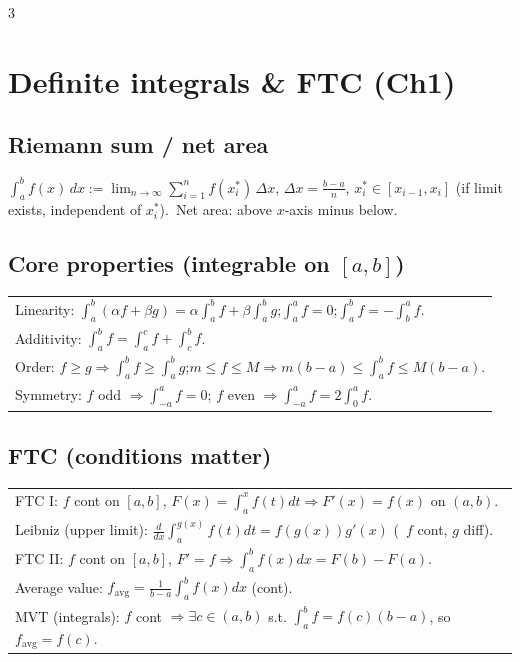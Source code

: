 \documentclass[10pt]{article}
\begin{document}
\begin{multicols}{3}
\footnotesize
\raggedcolumns

\section*{Definite integrals \& FTC (Ch1)}
\subsection*{Riemann sum / net area}
$\displaystyle \int_a^b f(x)\,dx:=\lim_{n\to\infty}\sum_{i=1}^n f(x_i^*)\,\Delta x$, $\Delta x=\frac{b-a}{n}$, $x_i^*\in[x_{i-1},x_i]$ (if limit exists, independent of $x_i^*$).\
Net area: above $x$-axis minus below.

\subsection*{Core properties (integrable on $[a,b]$)}
\vspace{-1pt}
\begin{tabular}{@{}p{}@{}}
Linearity: $\int_a^b(\alpha f+\beta g)=\alpha\int_a^b f+\beta\int_a^b g$;\quad $\int_a^a f=0$;\quad $\int_a^b f=-\int_b^a f$.\\
Additivity: $\int_a^b f=\int_a^c f+\int_c^b f$.\\
Order: $f\ge g\Rightarrow \int_a^b f\ge\int_a^b g$;\quad $m\le f\le M\Rightarrow m(b-a)\le\int_a^b f\le M(b-a)$.\\
Symmetry: $f$ odd $\Rightarrow\int_{-a}^a f=0$; $f$ even $\Rightarrow\int_{-a}^a f=2\int_0^a f$.\\
\end{tabular}

\subsection*{FTC (conditions matter)}
\vspace{-1pt}
\begin{tabular}{@{}p{}@{}}
FTC I: $f$ cont on $[a,b]$, $F(x)=\int_a^x f(t)dt\Rightarrow F'(x)=f(x)$ on $(a,b)$.\\
Leibniz (upper limit): $\frac{d}{dx}\int_a^{g(x)} f(t)dt=f(g(x))g'(x)$ (\ $f$ cont, $g$ diff).\\
FTC II: $f$ cont on $[a,b]$, $F'=f\Rightarrow\int_a^b f(x)dx=F(b)-F(a)$.\\
Average value: $f_{\text{avg}}=\frac{1}{b-a}\int_a^b f(x)dx$ (cont).\\
MVT (integrals): $f$ cont $\Rightarrow\exists c\in(a,b)$ s.t. $\int_a^b f=f(c)(b-a)$, so $f_{\text{avg}}=f(c)$.\\
\end{tabular}


\end{multicols}
\end{document}
